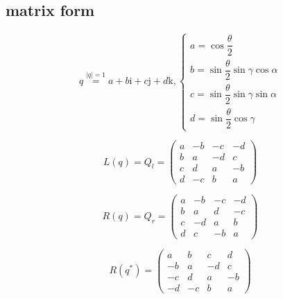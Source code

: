 \documentclass[
]{book}
\theoremstyle{definition}
\theoremstyle{definition}
\theoremstyle{definition}
\theoremstyle{definition}
\theoremstyle{remark}
\begin{document}
\hypertarget{matrix-form}{%
\subsection{matrix form}\label{matrix-form}}

\[
q\overset{\left|q\right|=1}{=}a+b\mathrm{i}+c\mathrm{j}+d\mathrm{k},\begin{cases}
a=\cos\dfrac{\theta}{2}\\
b=\sin\dfrac{\theta}{2}\sin\gamma\cos\alpha\\
c=\sin\dfrac{\theta}{2}\sin\gamma\sin\alpha\\
d=\sin\dfrac{\theta}{2}\cos\gamma
\end{cases}
\]

\[
L\left(q\right)=Q_{{\scriptscriptstyle l}}=\begin{pmatrix}a & -b & -c & -d\\
b & a & -d & c\\
c & d & a & -b\\
d & -c & b & a
\end{pmatrix}
\]

\[
R\left(q\right)=Q_{{\scriptscriptstyle r}}=\begin{pmatrix}a & -b & -c & -d\\
b & a & d & -c\\
c & -d & a & b\\
d & c & -b & a
\end{pmatrix}
\]

\[
R\left(q^{*}\right)=\begin{pmatrix}a & b & c & d\\
-b & a & -d & c\\
-c & d & a & -b\\
-d & -c & b & a
\end{pmatrix}
\]
\end{document}
